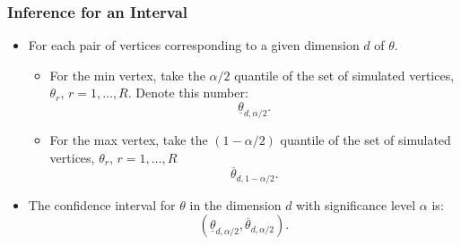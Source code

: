 \documentclass[notes=show]{beamer}
\begin{document}
\begin{frame}
\frametitle{Inference for an Interval}

\begin{itemize}
\item For each pair of vertices corresponding to a given dimension $d$ of $%
\theta$. 

\begin{itemize}
\item For the min vertex, take the $\alpha/2$ quantile of the set of
simulated vertices, $\theta_{r}$, $r=1,\dots,R$. Denote this number:  
\begin{equation*}
\underline{\theta}_{d,\alpha/2}.
\end{equation*}

\item For the max vertex, take the $(1-\alpha/2)$ quantile of the set of
simulated vertices, $\theta_{r}$, $r=1,\dots,R$  
\begin{equation*}
\overline{\theta}_{d,1-\alpha/2}.
\end{equation*}
\end{itemize}

\item The confidence interval for $\theta$ in the dimension $d$ with
significance level $\alpha$ is:  
\begin{equation*}
(\underline{\theta}_{d,\alpha/2},\overline{\theta}_{d,\alpha/2}).
\end{equation*}
\end{itemize}
\end{frame}

\end{document}
